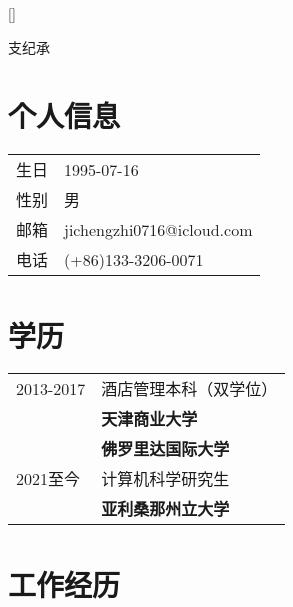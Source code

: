 \documentclass[11pt,a4paper]{article}
\begin{document}
 

\pagestyle{empty}
\setlength{\textwidth}{500pt}

\titleformat{\section}{\large\scshape\raggedright}{}{0em}{}[\titlerule]
\titlespacing{\section}{0pt}{3pt}{3pt}

\par{\centering
		{\Huge 支纪承
	}\bigskip
	\par}
	
\section{个人信息}

\noindent\begin{tabular}{p{7cm} l}
	\textsc{生日} & \textsc{1995-07-16} \\
	\textsc{性别} & \textsc{男}\\
    \textsc{邮箱} & jichengzhi0716@icloud.com\\
    \textsc{电话} & \textsc{(+86)133-3206-0071}
    
\end{tabular}

\section{学历}

\noindent\begin{tabular}{p{7cm} l}
	\textsc{2013-2017} 
		& 酒店管理本科（双学位）\\
		&\textbf{天津商业大学}\\
		&\textbf{佛罗里达国际大学}\\
	\textsc{2021至今} 
		& 计算机科学研究生\\
		&\textbf{亚利桑那州立大学}\\
\end{tabular}

\section{工作经历}
\end{document}
